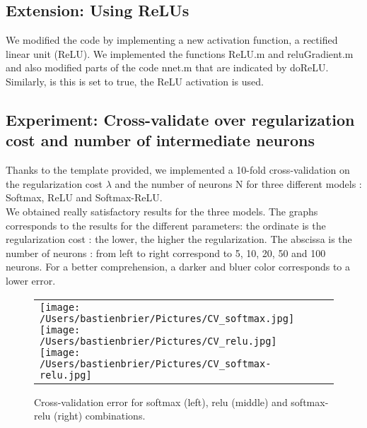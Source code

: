 \documentclass[11pt, oneside]{article}   	%
\begin{document}
\subsection{Extension: Using ReLUs}
\vspace{4pt}
We modified the code by implementing a new activation function, a rectified linear unit (ReLU). We implemented the functions ReLU.m and reluGradient.m and also modified parts of the code nnet.m that are indicated by doReLU. Similarly, is this is set to true, the ReLU activation is used.

\subsection{Experiment: Cross-validate over regularization cost and number of intermediate neurons}
\vspace{4pt}
Thanks to the template provided, we implemented a 10-fold cross-validation on the regularization cost $\lambda$ and the number of neurons N for three different models : Softmax, ReLU and Softmax-ReLU.\\
We obtained really satisfactory results for the three models. The graphs corresponds to the results for the different parameters: the ordinate is the regularization cost : the lower, the higher the regularization. The abscissa is the number of neurons : from left to right correspond to 5, 10, 20, 50 and 100 neurons. For a better comprehension, a darker and bluer color corresponds to a lower error.\\
	\begin{figure}[h]
		\raggedleft
		\caption{Cross-validation error for softmax (left), relu (middle) and softmax-relu (right) combinations.}
		\begin{tabular}[h]{lll}
			\texttt{[image: /Users/bastienbrier/Pictures/CV\_softmax.jpg]}
			\texttt{[image: /Users/bastienbrier/Pictures/CV\_relu.jpg]}
			\texttt{[image: /Users/bastienbrier/Pictures/CV\_softmax-relu.jpg]}
		\end{tabular}
	\end{figure}
 
\end{document}
